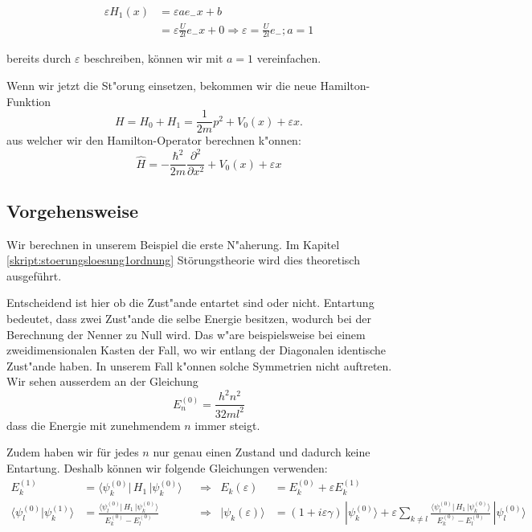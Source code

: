 \begin{refsection}
\begin{equation}
\begin{aligned}
  \varepsilon H_1(x) &= \varepsilon a e_{-} x +b \\
                     &= \varepsilon \frac{ U }{2 l} e_{-} x + 0 
     \Longrightarrow \varepsilon = \frac{ U }{2 l} e_{-} ; a = 1
\end{aligned}
\end{equation}

bereits durch $\varepsilon$ beschreiben, k\"onnen wir mit $a = 1$ vereinfachen.





Wenn wir jetzt die St"orung einsetzen, bekommen wir die neue Hamilton-Funktion
\[
  H = H_0 + H_1 
    = \frac1{2m}p^2+V_0(x) + \varepsilon x.
\]
aus welcher wir den Hamilton-Operator berechnen k"onnen:
\[
  \hat{H} = -\frac{\hbar^2}{2m} \frac{\partial^2}{\partial x^2} + V_0(x) + \varepsilon x
\]

\subsection{Vorgehensweise}
Wir berechnen in unserem Beispiel die erste N"aherung.
Im Kapitel \ref{skript:stoerungsloesung1ordnung} St\"orungstheorie wird dies 
theoretisch ausgef\"uhrt.

Entscheidend ist hier ob die Zust"ande entartet sind oder nicht.
Entartung bedeutet, dass zwei Zust"ande die selbe Energie besitzen, 
wodurch bei der Berechnung der Nenner zu Null wird.
Das w"are beispielsweise bei einem zweidimensionalen Kasten der Fall,
wo wir entlang der Diagonalen identische Zust"ande haben.
In unserem Fall k"onnen solche Symmetrien nicht auftreten.
Wir sehen ausserdem an der Gleichung
\[
  E_n^{(0)} = \frac{h^2n^2}{32ml^2}
\]
dass die Energie mit zunehmendem $n$ immer steigt. 

Zudem haben wir f\"ur jedes $n$ nur genau einen Zustand und dadurch keine Entartung. 
Deshalb k\"onnen wir folgende Gleichungen verwenden:
\begin{equation}
\begin{aligned}
E_k^{(1)} &=
\langle \psi_k^{(0)}|\, H_1 \,|\psi_k^{(0)}\rangle
&&\Longrightarrow
& E_k(\varepsilon)&=E_k^{(0)} + \varepsilon E_k^{(1)}
\\
\langle\psi_l^{(0)}|\psi_k^{(1)}\rangle
&=
\frac{\langle \psi_l^{(0)}|\, H_1 \,|\psi_k^{(0)}\rangle}{E_k^{(0)}-E_l^{(0)}}
&&\Longrightarrow
& |\psi_k(\varepsilon)\rangle &=
(1+i\varepsilon \gamma)
\,|\psi_k^{(0)}\rangle
+
\varepsilon
\sum_{k\ne l}
\frac{\langle \psi_l^{(0)}|\, H_1 \,|\psi_k^{(0)}\rangle}{E_k^{(0)}-E_l^{(0)}}
\,
|\psi_l^{(0)}\rangle
\label{eq:efeld_ESkalarprodukt}
\end{aligned}
\end{equation}









\end{refsection}
